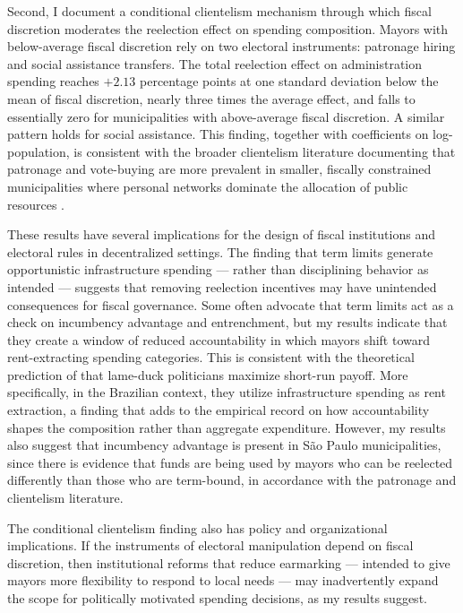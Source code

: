 \documentclass[12pt, a4paper]{article}
\begin{document}
Second, I document a conditional clientelism mechanism through which fiscal discretion moderates the reelection effect on spending composition. Mayors with below-average fiscal discretion rely on two electoral instruments: patronage hiring and social assistance transfers. The total reelection effect on administration spending reaches $+2.13$ percentage points at one standard deviation below the mean of fiscal discretion, nearly three times the average effect, and falls to essentially zero for municipalities with above-average fiscal discretion. A similar pattern holds for social assistance. This finding, together with coefficients on log-population, is consistent with the broader clientelism literature documenting that patronage and vote-buying are more prevalent in smaller, fiscally constrained municipalities where personal networks dominate the allocation of public resources \cite{nichter:2018}.

These results have several implications for the design of fiscal institutions and electoral rules in decentralized settings. The finding that term limits generate opportunistic infrastructure spending --- rather than disciplining behavior as intended --- suggests that removing reelection incentives may have unintended consequences for fiscal governance. Some often advocate that term limits act as a check on incumbency advantage and entrenchment, but my results indicate that they create a window of reduced accountability in which mayors shift toward rent-extracting spending categories. This is consistent with the theoretical prediction of  that lame-duck politicians maximize short-run payoff. More specifically, in the Brazilian context, they utilize infrastructure spending as rent extraction, a finding that adds to the empirical record on how accountability shapes the composition rather than aggregate expenditure. However, my results also suggest that incumbency advantage is present in São Paulo municipalities, since there is evidence that funds are being used by mayors who can be reelected differently than those who are term-bound, in accordance with the patronage and clientelism literature.

The conditional clientelism finding also has policy and organizational implications. If the instruments of electoral manipulation depend on fiscal discretion, then institutional reforms that reduce earmarking --- intended to give mayors more flexibility to respond to local needs --- may inadvertently expand the scope for politically motivated spending decisions, as my results suggest.
\end{document}
